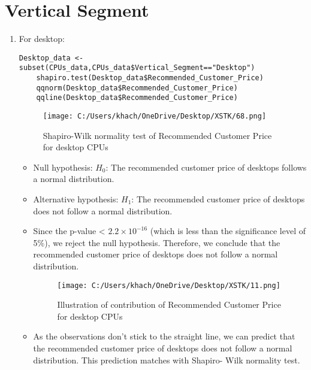 \documentclass[a4paper]{article}
\begin{document}
	\section*{Vertical Segment}
	\begin{enumerate}
		\item For desktop:
	\begin{lstlisting}[frame=single, backgroundcolor=\color{gray!10}, breaklines=true, columns=fullflexible]
	Desktop_data <- subset(CPUs_data,CPUs_data$Vertical_Segment=="Desktop")
	shapiro.test(Desktop_data$Recommended_Customer_Price)
	qqnorm(Desktop_data$Recommended_Customer_Price)
	qqline(Desktop_data$Recommended_Customer_Price)
	\end{lstlisting}
	\begin{figure}[htbp]
		\centering
		\begin{adjustbox}{width=0.7\textwidth, frame}
			\texttt{[image: C:/Users/khach/OneDrive/Desktop/XSTK/68.png]}
		\end{adjustbox}
		\captionsetup{justification=centering}
		\vspace{0.5cm}
		\caption{Shapiro-Wilk normality test of Recommended Customer Price for desktop CPUs}
	\end{figure}
	\begin{itemize}
		\item Null hypothesis:
		\( H_0 \): The recommended customer price of desktops follows a normal distribution.
		\item Alternative hypothesis:
		\( H_1 \): The recommended customer price of desktops does not follow a normal distribution.
		\item Since the p-value < \(2.2 \times 10^{-16}\) (which is less than the significance level of 5\%), we reject the null hypothesis. Therefore, we conclude that the recommended customer price of desktops does not follow a normal distribution.
		\begin{figure}[htbp]
			\centering
			\begin{adjustbox}{width=0.7\textwidth, frame}
				\texttt{[image: C:/Users/khach/OneDrive/Desktop/XSTK/11.png]}
			\end{adjustbox}
			\captionsetup{justification=centering}
			\vspace{0.5cm}
			\caption{Illustration of contribution of Recommended Customer Price for desktop CPUs}
		\end{figure}
		\item As the observations don't stick to the straight line, we can predict that the recommended customer price of desktops does not follow a normal distribution. This prediction matches with Shapiro- Wilk normality test.

\end{itemize}
\end{enumerate}
\end{document}
